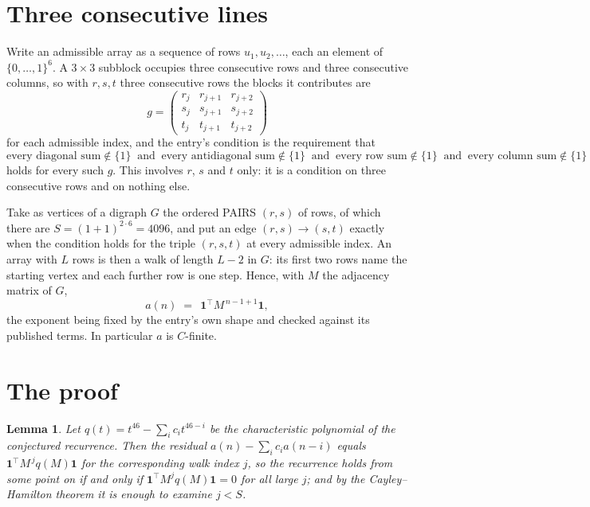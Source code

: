 \documentclass[11pt,a4paper]{article}
\theoremstyle{plain}
\newtheorem{lemma}[theorem]{Lemma}
\theoremstyle{definition}
\begin{document}
\section{Three consecutive lines}

Write an admissible array as a sequence of rows $u_1,u_2,\dots$, each an element of
$\{0,\dots,1\}^{6}$. A $3\times3$ subblock occupies three consecutive rows and
three consecutive columns, so with $r,s,t$ three consecutive rows the blocks it
contributes are
\[
g=\begin{pmatrix}r_j&r_{j+1}&r_{j+2}\\ s_j&s_{j+1}&s_{j+2}\\ t_j&t_{j+1}&t_{j+2}\end{pmatrix}
\]
for each admissible index, and the entry's condition is the requirement that
\[
\text{every diagonal sum} \notin \{1\}\ \text{ and }\ \text{every antidiagonal sum} \notin \{1\}\ \text{ and }\ \text{every row sum} \notin \{1\}\ \text{ and }\ \text{every column sum} \notin \{1\}
\]
holds for every such $g$. This involves $r$, $s$ and $t$ only: it is a condition on
three consecutive rows and on nothing else.

Take as vertices of a digraph $G$ the ordered PAIRS $(r,s)$ of rows, of which there are
$S=(1+1)^{2\cdot6}=4096$, and put an edge $(r,s)\to(s,t)$ exactly when the condition
holds for the triple $(r,s,t)$ at every admissible index. An array with $L$ rows is then a
walk of length $L-2$ in $G$: its first two rows name the starting vertex and each further
row is one step. Hence, with $M$ the adjacency matrix of $G$,
\[
a(n)\;=\;\,\mathbf{1}^{\!\top}M^{\,n-1+1}\mathbf{1},
\]
the exponent being fixed by the entry's own shape and checked against its published terms.
In particular $a$ is $C$-finite.

\section{The proof}

\begin{lemma}\label{lem:crit}
Let $q(t)=t^{46}-\sum_i c_it^{46-i}$ be the characteristic polynomial of the
conjectured recurrence. Then the residual $a(n)-\sum_ic_ia(n-i)$ equals
$\mathbf{1}^{\!\top}M^{\,j}q(M)\mathbf{1}$ for the corresponding walk index
$j$, so the recurrence holds from some point on if and only if
$\mathbf{1}^{\!\top}M^{j}q(M)\mathbf{1}=0$ for all large $j$; and by the
Cayley--Hamilton theorem it is enough to examine $j<S$.
\end{lemma}
\end{document}
